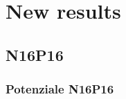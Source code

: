 \section{New results}
\subsection{N16P16}

\begin{frame}
\tableofcontents[currentsection]
\end{frame}

\begin{frame}
\frametitle{Potenziale N16P16}
\begin{columns}

\begin{column}{0.3 \textwidth}
\begin{center}
\begin{figure}[!h]
          \end{figure}
\end{center}
\end{column}

\begin{column}{0.3 \textwidth}
\begin{center}
\begin{figure}[!h]
         \subfigure[Coeff Ox]
          {\texttt{[image: N16P16XZ]}}
\end{figure}
\end{center}
\end{column}

\begin{column}{0.3 \textwidth}
\begin{center}
\begin{figure}[!h]
\end{figure}
\end{center}
\end{column}

\end{columns}

\end{frame}

